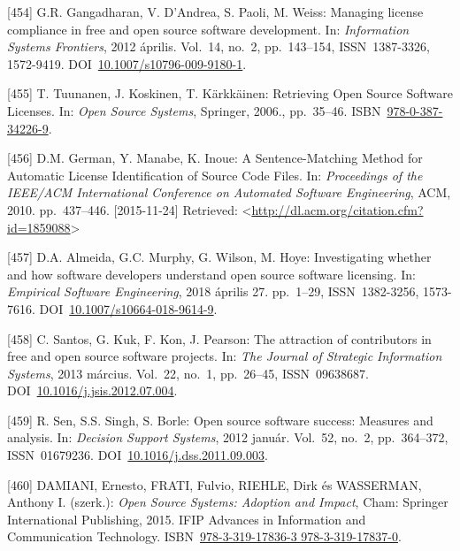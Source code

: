 \documentclass[12pt,magyar,a4paper,oneside]{scrreprt}
\newenvironment{cslreferences}%
  {}%
  {\par}
\begin{document}
\begin{cslreferences}
\leavevmode\hypertarget{ref-gangadharan_managing_2012}{}%
{[}454{]} G.R. Gangadharan, V. D'Andrea, S. Paoli, M. Weiss: Managing
license compliance in free and open source software development. In:
\emph{Information Systems Frontiers}, 2012 április. Vol.~14, no.~2,
pp.~143--154, ISSN~1387-3326, 1572-9419.
DOI~\href{https://doi.org/10.1007/s10796-009-9180-1}{10.1007/s10796-009-9180-1}.

\leavevmode\hypertarget{ref-tuunanen_retrieving_2006}{}%
{[}455{]} T. Tuunanen, J. Koskinen, T. Kärkkäinen: Retrieving Open
Source Software Licenses. In: \emph{Open Source Systems}, Springer,
2006., pp.~35--46.
ISBN~\href{https://worldcat.org/isbn/978-0-387-34226-9}{978-0-387-34226-9}.

\leavevmode\hypertarget{ref-german_sentence-matching_2010}{}%
{[}456{]} D.M. German, Y. Manabe, K. Inoue: A Sentence-Matching Method
for Automatic License Identification of Source Code Files. In:
\emph{Proceedings of the IEEE/ACM International Conference on Automated
Software Engineering}, ACM, 2010. pp.~437--446. {[}2015-11-24{]}
Retrieved:
\textless{}\url{http://dl.acm.org/citation.cfm?id=1859088}\textgreater{}

\leavevmode\hypertarget{ref-almeida_investigating_2018}{}%
{[}457{]} D.A. Almeida, G.C. Murphy, G. Wilson, M. Hoye: Investigating
whether and how software developers understand open source software
licensing. In: \emph{Empirical Software Engineering}, 2018 április 27.
pp.~1--29, ISSN~1382-3256, 1573-7616.
DOI~\href{https://doi.org/10.1007/s10664-018-9614-9}{10.1007/s10664-018-9614-9}.

\leavevmode\hypertarget{ref-santos_attraction_2013}{}%
{[}458{]} C. Santos, G. Kuk, F. Kon, J. Pearson: The attraction of
contributors in free and open source software projects. In: \emph{The
Journal of Strategic Information Systems}, 2013 március. Vol.~22, no.~1,
pp.~26--45, ISSN~09638687.
DOI~\href{https://doi.org/10.1016/j.jsis.2012.07.004}{10.1016/j.jsis.2012.07.004}.

\leavevmode\hypertarget{ref-sen_open_2012}{}%
{[}459{]} R. Sen, S.S. Singh, S. Borle: Open source software success:
Measures and analysis. In: \emph{Decision Support Systems}, 2012 január.
Vol.~52, no.~2, pp.~364--372, ISSN~01679236.
DOI~\href{https://doi.org/10.1016/j.dss.2011.09.003}{10.1016/j.dss.2011.09.003}.

\leavevmode\hypertarget{ref-damiani_open_2015}{}%
{[}460{]} DAMIANI, Ernesto, FRATI, Fulvio, RIEHLE, Dirk és WASSERMAN,
Anthony I. (szerk.): \emph{Open Source Systems: Adoption and Impact},
Cham: Springer International Publishing, 2015. IFIP Advances in
Information and Communication Technology.
ISBN~\href{https://worldcat.org/isbn/978-3-319-17836-3\%20978-3-319-17837-0}{978-3-319-17836-3 978-3-319-17837-0}.


\end{cslreferences}
\end{document}
